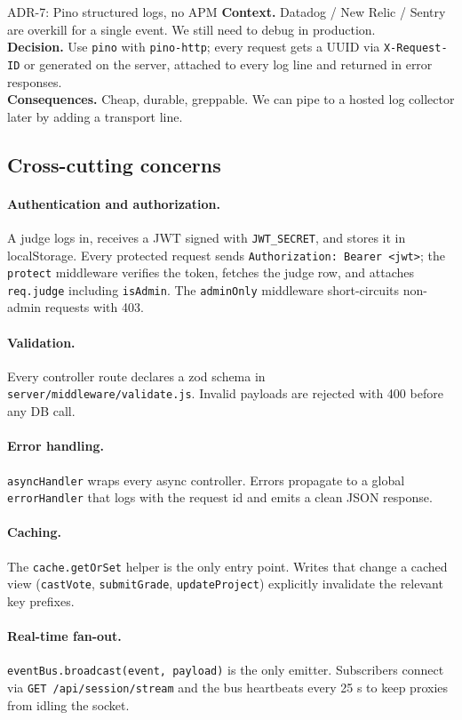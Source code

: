 \begin{ncbox}{ADR-7: Pino structured logs, no APM}
\textbf{Context.} Datadog / New Relic / Sentry are overkill for a single
event. We still need to debug in production.\\
\textbf{Decision.} Use \texttt{pino} with \texttt{pino-http}; every request
gets a UUID via \texttt{X-Request-ID} or generated on the server, attached to
every log line and returned in error responses.\\
\textbf{Consequences.} Cheap, durable, greppable. We can pipe to a hosted
log collector later by adding a transport line.
\end{ncbox}

\subsection{Cross-cutting concerns}

\paragraph{Authentication and authorization.} A judge logs in, receives a
JWT signed with \texttt{JWT\_SECRET}, and stores it in localStorage. Every
protected request sends \texttt{Authorization: Bearer <jwt>}; the
\texttt{protect} middleware verifies the token, fetches the judge row,
and attaches \texttt{req.judge} including \texttt{isAdmin}. The
\texttt{adminOnly} middleware short-circuits non-admin requests with 403.

\paragraph{Validation.} Every controller route declares a zod schema in
\texttt{server/middleware/validate.js}. Invalid payloads are rejected with
400 before any DB call.

\paragraph{Error handling.} \texttt{asyncHandler} wraps every async
controller. Errors propagate to a global \texttt{errorHandler} that logs
with the request id and emits a clean JSON response.

\paragraph{Caching.} The \texttt{cache.getOrSet} helper is the only entry
point. Writes that change a cached view (\texttt{castVote},
\texttt{submitGrade}, \texttt{updateProject}) explicitly invalidate the
relevant key prefixes.

\paragraph{Real-time fan-out.} \texttt{eventBus.broadcast(event, payload)}
is the only emitter. Subscribers connect via \texttt{GET /api/session/stream}
and the bus heartbeats every 25 s to keep proxies from idling the socket.
